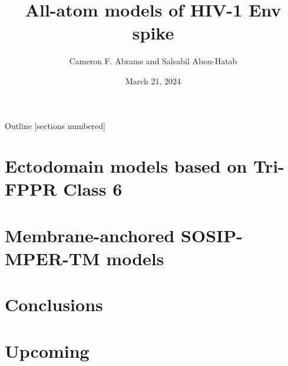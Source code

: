 \documentclass[10pt]{beamer}
\title{All-atom models of HIV-1 Env spike}
\date{March 21, 2024}
\author{Cameron F. Abrams and Salsabil Abou-Hatab}
\institute{Drexel University, Department of Chemical and Biological Engineering}
\begin{document}
\maketitle
\begin{frame}{Outline}
  [sections numbered]
  \tableofcontents[hideallsubsections]
\end{frame}

\section{Ectodomain models based on Tri-FPPR Class 6}










\section{Membrane-anchored SOSIP-MPER-TM models}



\section{Conclusions}


\section{Upcoming}





% 
\end{document}
